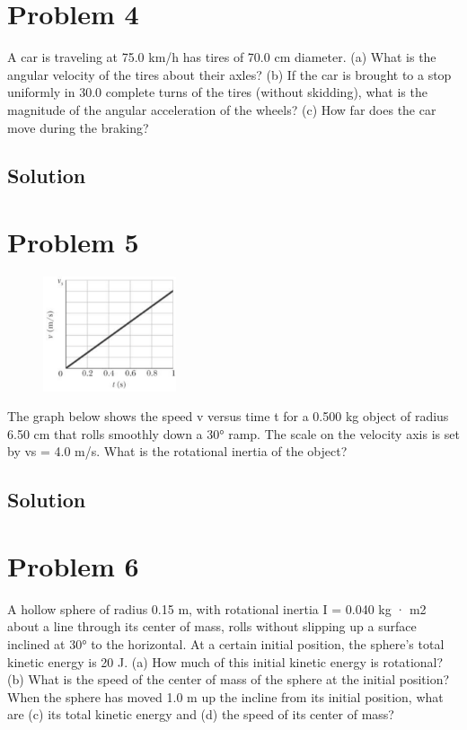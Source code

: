 \documentclass[12pt]{article}
\begin{document}
\pagebreak

\section{Problem 4}
A car is traveling at 75.0 km/h has tires of 70.0 cm diameter. (a) What is the angular velocity of the tires about their axles? (b) If the car is brought to a stop uniformly in 30.0 complete turns of the tires (without skidding), what is the magnitude of the angular acceleration of the wheels? (c) How far does the car move during the braking?

\subsection{Solution}


\pagebreak

\section{Problem 5}
\begin{figure}
    \vspace{-30pt}
    \includegraphics[width=0.35\textwidth]{graph_5.png} 
\end{figure}
The graph below shows the speed v versus time t for a 0.500 kg object of radius 6.50 cm that rolls smoothly down a 30\unit{\degree} ramp. The scale on the velocity axis is set by vs = 4.0 m/s. What is the rotational inertia of the object?

\subsection{Solution}


\pagebreak

\section{Problem 6}
A hollow sphere of radius 0.15 m, with rotational inertia I = 0.040 kg · m2 about a line through its center of mass, rolls without slipping up a surface inclined at 30° to the horizontal. At a certain initial position, the sphere's total kinetic energy is 20 J. (a) How much of this initial kinetic energy is rotational? (b) What is the speed of the center of mass of the sphere at the initial position? When the sphere has moved 1.0 m up the incline from its initial position, what are (c) its total kinetic energy and (d) the speed of its center of mass?
\end{document}
